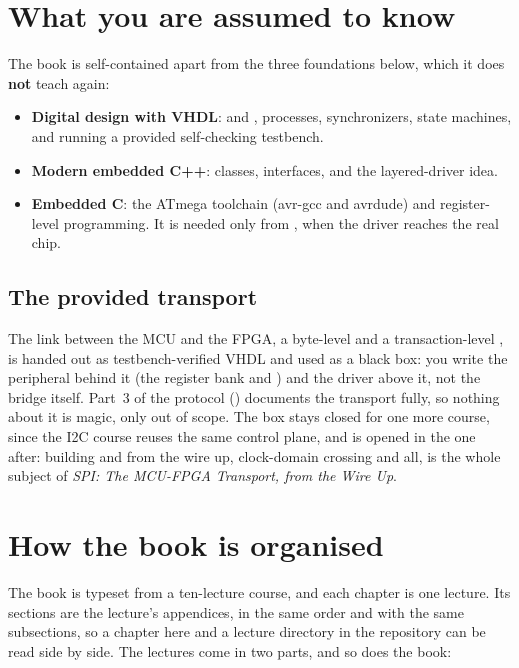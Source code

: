 \section*{What you are assumed to know}
The book is self-contained apart from the three foundations below, which it does \textbf{not}
teach again:
\begin{itemize}
  \item \textbf{Digital design with VHDL}:  and , processes,
    synchronizers, state machines, and running a provided self-checking testbench.
  \item \textbf{Modern embedded C++}: classes, interfaces, and the layered-driver idea.
  \item \textbf{Embedded C}: the ATmega toolchain (avr-gcc and avrdude) and register-level
    programming. It is needed only from , when the driver reaches the real chip.
\end{itemize}

\subsection*{The provided transport}
The link between the MCU and the FPGA, a byte-level  and a transaction-level
, is handed out as testbench-verified VHDL and used as a black box: you write
the peripheral behind it (the register bank and ) and the driver above it, not the
bridge itself. Part~3 of the protocol () documents the transport fully, so
nothing about it is magic, only out of scope. The box stays closed for one more course, since the
I2C course reuses the same control plane, and is opened in the one after: building
 and  from the wire up, clock-domain crossing and all, is the
whole subject of \emph{SPI: The MCU-FPGA Transport, from the Wire Up}.

\section*{How the book is organised}
The book is typeset from a ten-lecture course, and each chapter is one lecture. Its sections are the
lecture's appendices, in the same order and with the same subsections, so a chapter here and a
lecture directory in the repository can be read side by side. The lectures come in two parts, and so
does the book:

